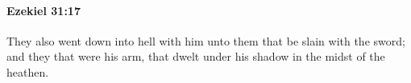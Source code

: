 
		\paragraph{Ezekiel 31:17} %
			\label{EZEKIEL-31-17}

			They also went down into hell with him unto them that be slain with the sword; and they that were his arm, that dwelt under his shadow in the midst of the heathen.


